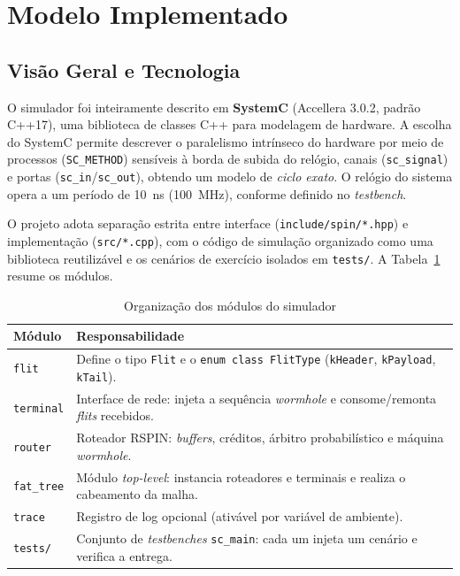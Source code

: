 \documentclass[conference]{IEEEtran}
\begin{document}
\section{Modelo Implementado}
\label{sec:modelo}

\subsection{Visão Geral e Tecnologia}
O simulador foi inteiramente descrito em \textbf{SystemC} (Accellera 3.0.2,
padrão C++17), uma biblioteca de classes C++ para modelagem de hardware. A
escolha do SystemC permite descrever o paralelismo intrínseco do hardware por
meio de processos (\texttt{SC\_METHOD}) sensíveis à borda de subida do relógio,
canais (\texttt{sc\_signal}) e portas (\texttt{sc\_in}/\texttt{sc\_out}),
obtendo um modelo de \emph{ciclo exato}. O relógio do sistema opera a um período
de \SI{10}{ns} (\SI{100}{MHz}), conforme definido no \emph{testbench}.

O projeto adota separação estrita entre interface (\texttt{include/spin/*.hpp}) e
implementação (\texttt{src/*.cpp}), com o código de simulação organizado como uma
biblioteca reutilizável e os cenários de exercício isolados em \texttt{tests/}.
A Tabela~\ref{tab:arquivos} resume os módulos.

\begin{table}[!t]
\caption{Organização dos módulos do simulador}
\label{tab:arquivos}
\centering
\renewcommand{\arraystretch}{1.2}
\begin{tabular}{@{}p{1.7cm}p{5.8cm}@{}}
\toprule
\textbf{Módulo} & \textbf{Responsabilidade} \\
\midrule
\texttt{flit}      & Define o tipo \texttt{Flit} e o \texttt{enum class FlitType} (\texttt{kHeader}, \texttt{kPayload}, \texttt{kTail}). \\
\texttt{terminal}  & Interface de rede: injeta a sequência \emph{wormhole} e consome/remonta \emph{flits} recebidos. \\
\texttt{router}    & Roteador RSPIN: \emph{buffers}, créditos, árbitro probabilístico e máquina \emph{wormhole}. \\
\texttt{fat\_tree} & Módulo \emph{top-level}: instancia roteadores e terminais e realiza o cabeamento da malha. \\
\texttt{trace}     & Registro de log opcional (ativável por variável de ambiente). \\
\texttt{tests/}    & Conjunto de \emph{testbenches} \texttt{sc\_main}: cada um injeta um cenário e verifica a entrega. \\
\bottomrule
\end{tabular}
\end{table}
\end{document}
